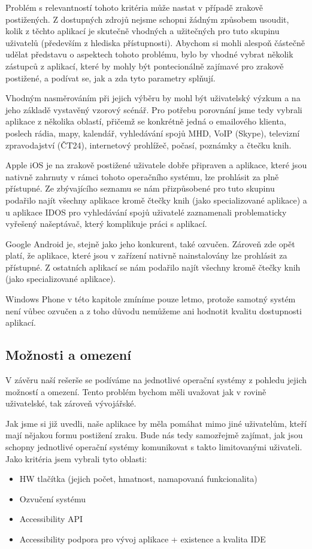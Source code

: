 \documentclass[thesis=M,czech]{FITthesis}[2012/06/26]
\begin{document}
Problém s relevantností tohoto kritéria může nastat v případě zrakově postižených. Z dostupných zdrojů nejsme schopni žádným způsobem usoudit, kolik z těchto aplikací je skutečně vhodných a užitečných pro tuto skupinu uživatelů (především z hlediska přístupnosti). Abychom si mohli alespoň částečně udělat představu o aspektech tohoto problému, bylo by vhodné vybrat několik zástupců z aplikací, které by mohly být pontecionálně zajímavé pro zrakově postižené, a podívat se, jak a zda tyto parametry splňují.

Vhodným nasměrováním při jejich výběru by mohl být uživatelský výzkum a na jeho základě vystavěný vzorový scénář. Pro potřebu porovnání jsme tedy vybrali aplikace z několika oblastí, přičemž se konkrétně jedná o emailového klienta, poslech rádia, mapy, kalendář, vyhledávání spojů MHD, VoIP (Skype), televizní zpravodajství (ČT24), internetový prohlížeč, počasí, poznámky a čtečku knih.

Apple iOS je na zrakově postižené uživatele dobře připraven a aplikace, které jsou nativně zahrnuty v rámci tohoto operačního systému\cite{ios_apps}, lze prohlásit za plně přístupné. Ze zbývajícího seznamu se nám přizpůsobené pro tuto skupinu podařilo najít všechny aplikace kromě čtečky knih (jako specializované aplikace) a u aplikace IDOS pro vyhledávání spojů uživatelé zaznamenali problematicky vyřešený našeptávač, který komplikuje práci s aplikací.

Google Android je, stejně jako jeho konkurent, také ozvučen. Zároveň zde opět platí, že aplikace, které jsou v zařízení nativně nainstalovány lze prohlásit za přístupné\cite{pristupnost}\cite{blind_apps}. Z ostatních aplikací se nám podařilo najít všechny kromě čtečky knih (jako specializované aplikace).

Windows Phone v této kapitole zmíníme pouze letmo, protože samotný systém není vůbec ozvučen a z toho důvodu nemůžeme ani hodnotit kvalitu dostupnosti aplikací.

\subsection{Možnosti a omezení}
V závěru naší rešerše se podíváme na jednotlivé operační systémy z pohledu jejich možností a omezení. Tento problém bychom měli uvažovat jak v rovině uživatelské, tak zároveň vývojářské.

Jak jsme si již uvedli, naše aplikace by měla pomáhat mimo jiné uživatelům, kteří mají nějakou formu postižení zraku. Bude nás tedy samozřejmě zajímat, jak jsou schopny jednotlivé operační systémy komunikovat s takto limitovanými uživateli. Jako kritéria jsem vybrali tyto oblasti:
\begin{itemize}
\item    HW tlačítka (jejich počet, hmatnost, namapovaná funkcionalita)
\item    Ozvučení systému
\item    Accessibility API
\item    Accessibility podpora pro vývoj aplikace + existence a kvalita IDE
\end{itemize}
\end{document}
